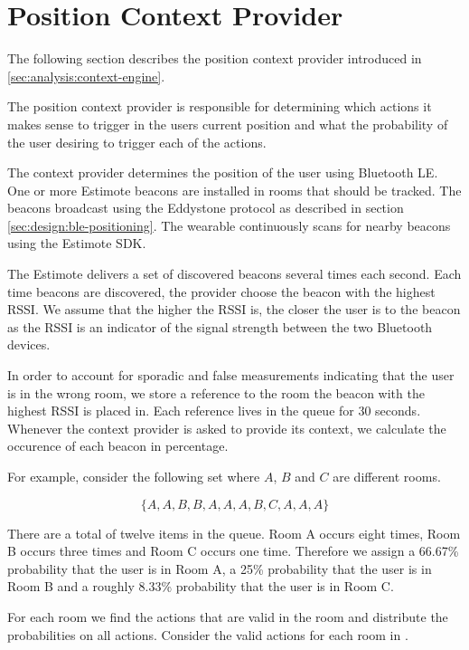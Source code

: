\section{Position Context Provider}
\label{sec:design:position-context-provider}

The following section describes the position context provider introduced in \cref{sec:analysis:context-engine}.

The position context provider is responsible for determining which actions it makes sense to trigger in the users current position and what the probability of the user desiring to trigger each of the actions.

The context provider determines the position of the user using Bluetooth LE. One or more Estimote beacons are installed in rooms that should be tracked. The beacons broadcast using the Eddystone protocol as described in section \ref{sec:design:ble-positioning}. The wearable continuously scans for nearby beacons using the Estimote SDK.

The Estimote delivers a set of discovered beacons several times each second. Each time beacons are discovered, the provider choose the beacon with the highest RSSI. We assume that the higher the RSSI is, the closer the user is to the beacon as the RSSI is an indicator of the signal strength between the two Bluetooth devices.

In order to account for sporadic and false measurements indicating that the user is in the wrong room, we store a reference to the room the beacon with the highest RSSI is placed in. Each reference lives in the queue for 30 seconds.  Whenever the context provider is asked to provide its context, we calculate the occurence of each beacon in percentage.

For example, consider the following set where $A$, $B$ and $C$ are different rooms.

\begin{equation*}
  \{ A, A, B, B, A, A, A, B, C, A, A, A \}
\end{equation*}

There are a total of twelve items in the queue. Room A occurs eight times, Room B occurs three times and Room C occurs one time. Therefore we assign a 66.67\% probability that the user is in Room A, a 25\% probability that the user is in Room B and a roughly 8.33\% probability that the user is in Room C.

For each room we find the actions that are valid in the room and distribute the probabilities on all actions. Consider the valid actions for each room in .


